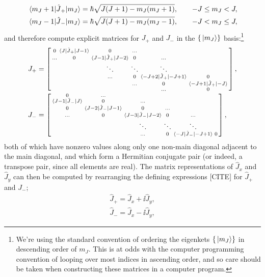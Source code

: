 \begin{align}
\matrixel{m_J + 1}{\hat J_+}{m_J} &= \hbar\sqrt{J(J + 1) - m_J(m_J + 1)}, \qquad -J \leq m_J < J,\\
\matrixel{m_J - 1}{\hat J_-}{m_J} &= \hbar\sqrt{J(J + 1) - m_J(m_J - 1)}, \qquad -J < m_J \leq J,
\end{align}
and therefore compute explicit matrices for $J_+$ and $J_-$ in the $\{\ket{m_J}\}$ basis:\footnote{We're using the standard convention of ordering the eigenkets $\{\ket{m_J}\}$ in descending order of $m_J$. This is at odds with the computer programming convention of looping over most indices in ascending order, and so care should be taken when constructing these matrices in a computer program.}
\begin{align}
J_+ &=
\left[\begin{smallmatrix}
0 &  \matrixel{J}{\hat J_+}{J - 1} & 0 & \hdots\\
\hdots & 0 & \matrixel{J - 1}{\hat J_+}{J - 2} & 0 & \hdots\\
& & \ddots & \ddots & \ddots\\
 & & \hdots & 0 & \matrixel{ -J + 2}{\hat J_+}{-J + 1} & 0\\
 & & & \hdots & 0 & \matrixel{ -J + 1}{\hat J_+}{-J}\\
 & & & & \hdots & 0\\
\end{smallmatrix} \right],\\
J_- &=
\left[\begin{smallmatrix}
    0 & \hdots \\
    \matrixel{J - 1}{\hat J_-}{J} & 0 & \hdots\\
    0 & \matrixel{J - 2}{\hat J_-}{J - 1} & 0 & \hdots\\
    \hdots & 0 & \matrixel{J - 3}{\hat J_-}{J - 2} & 0 & \hdots\\
    & & \ddots & \ddots & \ddots\\
    & & \hdots & 0 & \matrixel{-J}{\hat J_-}{-J + 1} & 0 \\
\end{smallmatrix} \right],
\end{align}
both of which have nonzero values along only one non-main diagonal adjacent to the main diagonal, and which form a Hermitian conjugate pair (or indeed, a transpose pair, since all elements are real). The matrix representations of $\hat J_x$ and $\hat J_y$ can then be computed by rearranging the defining expressions [CITE] for $\hat J_+$ and $J_-$;
\begin{align}
\hat J_+ = \hat J_x + \ii \hat J_y,\\
\hat J_- = \hat J_x - \ii \hat J_y,
\end{align}

